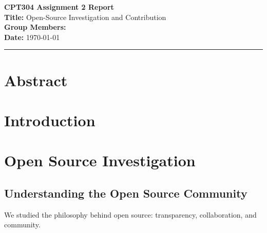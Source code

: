 \documentclass[12pt]{article}
\begin{document}
\noindent
\textbf{\Large CPT304 Assignment 2 Report} \\[0.5em]
\textbf{Title:} Open-Source Investigation and Contribution \\[0.5em]
\textbf{Group Members:} 
\\ [0.5em]
\textbf{Date:} \today

\vspace{1em}
\hrule
\vspace{1.5em}

\section*{Abstract}


\section{Introduction}


\section{Open Source Investigation}

\subsection{Understanding the Open Source Community}
We studied the philosophy behind open source: transparency, collaboration, and community.
\end{document}
